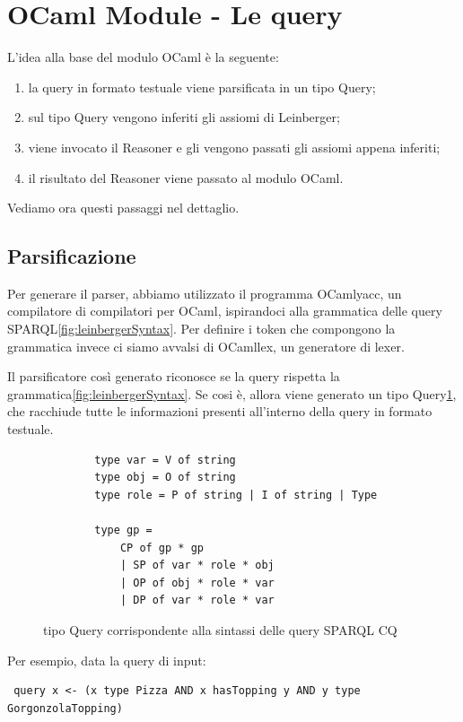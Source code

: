 \newpage
\section{OCaml Module - Le query} \label{sec:OCaml Module - Le query}
L'idea alla base del modulo OCaml è la seguente:
\begin{enumerate}
    \item la query in formato testuale viene parsificata in un tipo Query;
    \item sul tipo Query vengono inferiti gli assiomi di Leinberger;
    \item viene invocato il Reasoner e gli vengono passati gli assiomi appena inferiti;
    \item il risultato del Reasoner viene passato al modulo OCaml.
\end{enumerate}
Vediamo ora questi passaggi nel dettaglio.

\subsection{Parsificazione}
Per generare il parser, abbiamo utilizzato il programma OCamlyacc, un compilatore di compilatori per OCaml, ispirandoci alla grammatica delle query SPARQL\ref{fig:leinbergerSyntax}.
Per definire i token che compongono la grammatica invece ci siamo avvalsi di OCamllex, un generatore di lexer.

Il parsificatore così generato riconosce se la query rispetta la grammatica\ref{fig:leinbergerSyntax}. Se cosi è, allora viene generato un tipo Query\ref{fig:querType}, che racchiude tutte le informazioni presenti all'interno della query in formato testuale.

\begin{figure}[H]
    \centering
    \begin{verbatim}
    	type var = V of string
    	type obj = O of string
    	type role = P of string | I of string | Type
    	
    	type gp =
    		CP of gp * gp
    		| SP of var * role * obj
    		| OP of obj * role * var
    		| DP of var * role * var
    \end{verbatim}
    \caption{tipo Query corrispondente alla sintassi delle query SPARQL CQ}
    \label{fig:querType}
\end{figure}


Per esempio, data la query di input:

\begin{verbatim}
 query x <- (x type Pizza AND x hasTopping y AND y type GorgonzolaTopping)
\end{verbatim}

